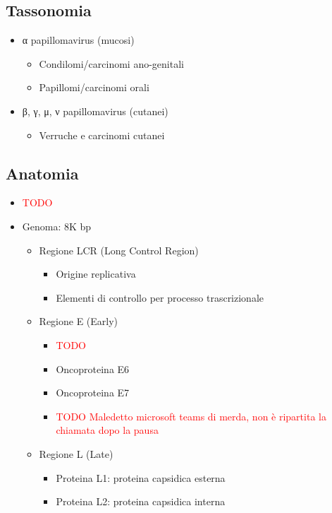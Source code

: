 \documentclass[italian,]{article}
\providecommand{\tightlist}{%
  \setlength{\itemsep}{0pt}\setlength{\parskip}{0pt}}
\newcommand{\asidefigure}[2]{\marginpar{\phantom{Img:}\newline\texttt{[image: \#1]}\\\footnotesize\emph{#2}}}
\newcommand{\TODO}[1]{\textcolor{red}{\textsf{\footnotesize{TODO #1}}}} %
\begin{document}
\hypertarget{tassonomia}{%
\subsection{Tassonomia}\label{tassonomia}}

\begin{itemize}
\tightlist
\item
  α papillomavirus (mucosi)

  \begin{itemize}
  \tightlist
  \item
    Condilomi/carcinomi ano-genitali
  \item
    Papillomi/carcinomi orali
  \end{itemize}
\item
  β, γ, μ, ν papillomavirus (cutanei)

  \begin{itemize}
  \tightlist
  \item
    Verruche e carcinomi cutanei
  \end{itemize}
\end{itemize}

\hypertarget{anatomia-1}{%
\subsection{Anatomia}\label{anatomia-1}}

\begin{itemize}
\item
  \TODO{}
\item
  Genoma: 8K bp \asidefigure{img/genoma-papillomavirus.png}{}

  \begin{itemize}
  \tightlist
  \item
    Regione LCR (Long Control Region)

    \begin{itemize}
    \tightlist
    \item
      Origine replicativa
    \item
      Elementi di controllo per processo trascrizionale
    \end{itemize}
  \item
    Regione E (Early)

    \begin{itemize}
    \item
      \TODO{}
    \item
      Oncoproteina E6
    \item
      Oncoproteina E7
    \item
      \TODO{Maledetto microsoft teams di merda, non è ripartita la chiamata dopo la pausa}
    \end{itemize}
  \item
    Regione L (Late)

    \begin{itemize}
    \tightlist
    \item
      Proteina L1: proteina capsidica esterna
    \item
      Proteina L2: proteina capsidica interna
    \end{itemize}
  \end{itemize}
\end{itemize}
\end{document}

